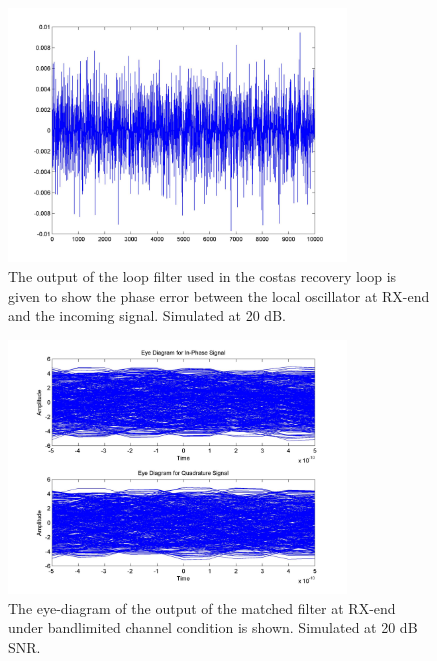\documentclass[]{article}
\begin{document}
\begin{figure}[H]
\centering
\includegraphics[width=0.8\textwidth]{loop_filter_qam20.jpg}
\caption{The output of the loop filter used in the costas recovery loop is given to show the phase error between the local oscillator at RX-end and the incoming signal. Simulated at 20 dB. \label{fig:qamLoop}}
\end{figure}

\begin{figure}[H]
\centering
\includegraphics[width=0.8\textwidth]{matched_eye_16qam20.jpg}
\caption{The eye-diagram of the output of the matched filter at RX-end under bandlimited channel condition is shown. Simulated at 20 dB SNR. \label{fig:qamEyeMatch}}
\end{figure}
\end{document}
